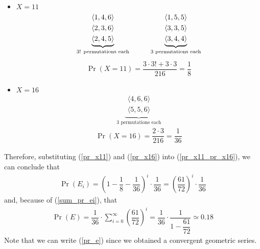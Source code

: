 \begin{itemize}
	\item $X = 11$
	\begin{align*}
		\underbrace{
			\begin{aligned}
				\langle 1,4,6 \rangle\\
				\langle 2,3,6 \rangle\\
				\langle 2,4,5 \rangle
			\end{aligned}
		}_{\text{3! permutations each}}
		\hspace{10mm}
		\underbrace{
			\begin{aligned}
				\langle 1,5,5 \rangle\\
				\langle 3,3,5 \rangle\\
				\langle 3,4,4 \rangle
			\end{aligned}
		}_{\text{3 permutations each}}
	\end{align*}
	\begin{align}
		\Pr(X = 11) = \dfrac{3 \cdot 3! + 3 \cdot 3}{216} = \dfrac{1}{8} \label{pr_x11}
	\end{align}
	
	\item $X = 16$
	\begin{align*}
		\underbrace{
			\begin{aligned}
				\langle 4,6,6 \rangle\\
				\langle 5,5,6 \rangle
			\end{aligned}
		}_{\text{3 permutations each}}
	\end{align*}
	\begin{align}
		\Pr(X = 16) = \dfrac{2 \cdot 3}{216} = \dfrac{1}{36} \label{pr_x16}
	\end{align}
\end{itemize}
Therefore, substituting (\ref{pr_x11}) and (\ref{pr_x16}) into (\ref{pr_x11_pr_x16}), we can conclude that
\begin{align}
	\Pr(E_i) = \left( 1 - \dfrac{1}{8} - \dfrac{1}{36} \right)^i \cdot \dfrac{1}{36} = \left( \dfrac{61}{72} \right)^i \cdot \dfrac{1}{36} \label{pr_ei}
\end{align}
and, because of (\ref{sum_pr_ei}), that
\begin{align}
	\Pr(E) = \dfrac{1}{36} \cdot \sum_{i = 0}^{\infty}\left( \dfrac{61}{72} \right)^i = \dfrac{1}{36} \cdot \dfrac{1}{1 - \dfrac{61}{72}} \simeq 0.18 \label{pr_e}
\end{align}
Note that we can write (\ref{pr_e}) since we obtained a convergent geometric series.\\
